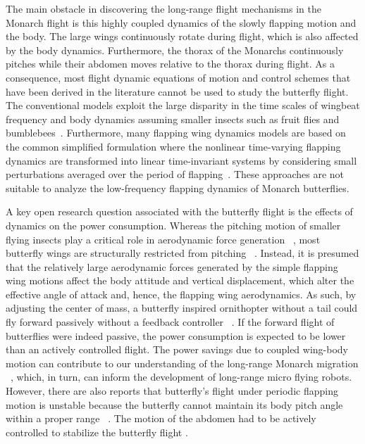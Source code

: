 \documentclass[conf]{new-aiaa}
\begin{document}
The main obstacle in discovering the long-range flight mechanisms in the Monarch flight is this highly coupled dynamics of the slowly flapping motion and the body.
The large wings continuously rotate during flight, which is also affected by the body dynamics.
Furthermore, the thorax of the Monarchs continuously pitches while their abdomen moves relative to the thorax during flight.
As a consequence, most flight dynamic equations of motion and control schemes that have been derived in the literature cannot be used to study the butterfly flight.
The conventional models exploit the large disparity in the time scales of wingbeat frequency and body dynamics assuming smaller insects such as fruit flies and bumblebees~\cite{Elzinga2015,Taha2012}.
Furthermore, many flapping wing dynamics models are based on the common simplified formulation where the nonlinear time-varying flapping dynamics are transformed into linear time-invariant systems by considering small perturbations averaged over the period of flapping~\cite{Schenato2003,Deng2006,Doman2010,Shyy}.
These approaches are not suitable to analyze the low-frequency flapping dynamics of Monarch butterflies. 

A key open research question associated with the butterfly flight is the effects of dynamics on the power consumption.
Whereas the pitching motion of smaller flying insects play a critical role in aerodynamic force generation ~\cite{Dickinson1999b,Shyy2013}, most butterfly wings are structurally restricted from pitching ~\cite{Tanaka2010}.
Instead, it is presumed that the relatively large aerodynamic forces generated by the simple flapping wing motions affect the body attitude and vertical displacement, which alter the effective angle of attack and, hence, the flapping wing aerodynamics.
As such, by adjusting the center of mass, a butterfly inspired ornithopter without a tail could fly forward passively without a feedback controller ~\cite{Tanaka2010}.
If the forward flight of butterflies were indeed passive, the power consumption is expected to be lower than an actively controlled flight.
The power savings due to coupled wing-body motion can contribute to our understanding of the long-range Monarch migration ~\cite{Sridhar2019}, which, in turn, can inform the development of long-range micro flying robots.
However, there are also reports that butterfly’s flight under periodic flapping motion is unstable because the butterfly cannot maintain its body pitch angle within a proper range ~\cite{Yokoyama2013,Jayakumar2018}.
The motion of the abdomen had to be actively controlled to stabilize the butterfly flight \cite{Jayakumar2018}.
\end{document}
